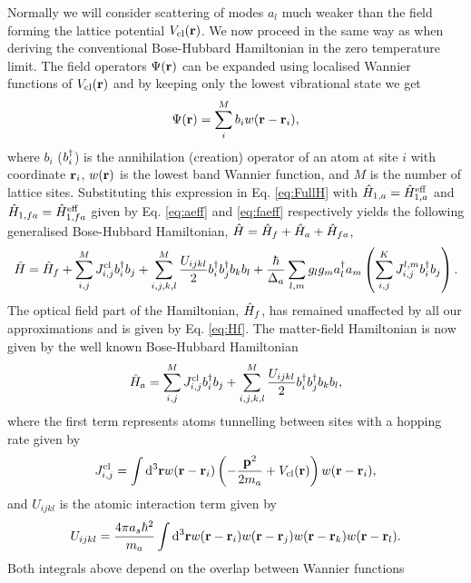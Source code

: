 Normally we will consider scattering of modes $a_l$ much weaker than
the field forming the lattice potential $V_\mathrm{cl}(\mathbf{r})$. We now
proceed in the same way as when deriving the conventional Bose-Hubbard
Hamiltonian in the zero temperature limit. The field operators
$\Psi(\mathbf{r})$ can be expanded using localised Wannier functions of
$V_\mathrm{cl}(\mathbf{r})$ and by keeping only the lowest vibrational
state we get
\begin{equation}
  \Psi(\mathbf{r}) = \sum_i^M b_i w(\mathbf{r} - \mathbf{r}_i),
\end{equation} 
where $b_i$ ($b^\dagger_i$) is the annihilation (creation) operator of an
atom at site $i$ with coordinate $\mathbf{r}_i$, $w(\mathbf{r})$ is the lowest
band Wannier function, and $M$ is the number of lattice
sites. Substituting this expression in Eq. \eqref{eq:FullH} with
$\hat{H}_{1,a} = \hat{H}_{1,a}^\mathrm{eff}$ and
$\hat{H}_{1,fa} = \hat{H}_{1,fa}^\mathrm{eff}$ given by Eq. \eqref{eq:aeff} and
\eqref{eq:faeff} respectively yields the following generalised
Bose-Hubbard Hamiltonian, $\hat{H} = \hat{H}_f + \hat{H}_a + \hat{H}_{fa}$,
\begin{equation}
  \hat{H} = \hat{H}_f + \sum_{i,j}^M J^\mathrm{cl}_{i,j} b^\dagger_i b_j + 
  \sum_{i,j,k,l}^M \frac{U_{ijkl}}{2} b^\dagger_i b^\dagger_j b_k b_l + 
  \frac{\hbar}{\Delta_a} \sum_{l,m} g_l g_m a^\dagger_l a_m 
  \left( \sum_{i,j}^K J^{l,m}_{i,j} b^\dagger_i b_j \right).
\end{equation}
The optical field part of the Hamiltonian, $\hat{H}_f$, has remained
unaffected by all our approximations and is given by
Eq. \eqref{eq:Hf}. The matter-field Hamiltonian is now given by the
well known Bose-Hubbard Hamiltonian
\begin{equation}
  \hat{H}_a = \sum_{i,j}^M J^\mathrm{cl}_{i,j} b^\dagger_i b_j + 
  \sum_{i,j,k,l}^M \frac{U_{ijkl}}{2} b^\dagger_i b^\dagger_j b_k b_l,
\end{equation}
where the first term represents atoms tunnelling between sites with a
hopping rate given by
\begin{equation}
  J^\mathrm{cl}_{i,j} = \int \mathrm{d}^3 \mathbf{r} w (\mathbf{r} - \mathbf{r}_i ) 
  \left( -\frac{\mathbf{p}^2}{2 m_a} + V_\mathrm{cl}(\mathbf{r}) \right) w(\mathbf{r}
  - \mathbf{r}_i),
\end{equation}
and $U_{ijkl}$ is the atomic interaction term given by
\begin{equation}
  U_{ijkl} = \frac{4 \pi a_s \hbar^2}{m_a} \int \mathrm{d}^3 \mathbf{r} 
  w(\mathbf{r} - \mathbf{r}_i) w(\mathbf{r} - \mathbf{r}_j) w(\mathbf{r} - \mathbf{r}_k) w(\mathbf{r} - \mathbf{r}_l).
\end{equation}
Both integrals above depend on the overlap between Wannier functions
